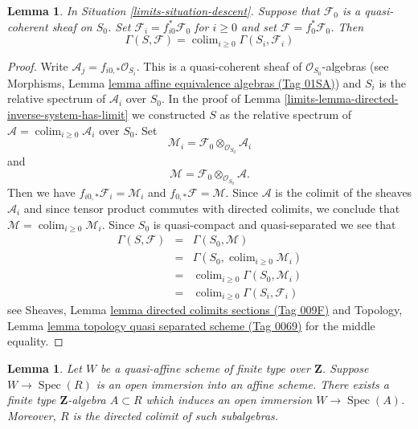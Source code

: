 \documentclass{amsart}
\theoremstyle{plain}
\newtheorem{lemma}[subsection]{Lemma}
\theoremstyle{definition}
\theoremstyle{remark}
\numberwithin{equation}{subsection}
\def\colim{\mathop{\mathrm{colim}}\nolimits}
\def\Spec{\mathop{\mathrm{Spec}}}
\begin{document}
\begin{lemma}
\label{limits-lemma-descend-section}
In Situation \ref{limits-situation-descent}.
Suppose that $\mathcal{F}_0$ is a quasi-coherent sheaf on $S_0$.
Set $\mathcal{F}_i = f_{i0}^*\mathcal{F}_0$ for $i \geq 0$ and set
$\mathcal{F} = f_0^*\mathcal{F}_0$.
Then
$$
\Gamma(S, \mathcal{F}) = \colim_{i \geq 0} \Gamma(S_i, \mathcal{F}_i)
$$
\end{lemma}

\begin{proof}
Write $\mathcal{A}_j = f_{i0, *} \mathcal{O}_{S_i}$.
This is a quasi-coherent sheaf of $\mathcal{O}_{S_0}$-algebras
(see Morphisms, Lemma \href{https://stacks.math.columbia.edu/tag/01SA}{lemma affine equivalence algebras (Tag 01SA)})
and $S_i$ is the relative spectrum of $\mathcal{A}_i$ over $S_0$.
In the proof of Lemma \ref{limits-lemma-directed-inverse-system-has-limit}
we constructed $S$ as the relative spectrum of
$\mathcal{A} = \colim_{i \geq 0} \mathcal{A}_i$
over $S_0$. Set
$$
\mathcal{M}_i = \mathcal{F}_0 \otimes_{\mathcal{O}_{S_0}} \mathcal{A}_i
$$
and
$$
\mathcal{M} = \mathcal{F}_0 \otimes_{\mathcal{O}_{S_0}} \mathcal{A}.
$$
Then we have $f_{i0, *} \mathcal{F}_i = \mathcal{M}_i$
and $f_{0, *}\mathcal{F} = \mathcal{M}$. Since $\mathcal{A}$
is the colimit of the sheaves $\mathcal{A}_i$ and since tensor
product commutes with directed colimits, we conclude that
$\mathcal{M} = \colim_{i \geq 0} \mathcal{M}_i$.
Since $S_0$ is quasi-compact and quasi-separated we see that
\begin{eqnarray*}
\Gamma(S, \mathcal{F})
& = &
\Gamma(S_0, \mathcal{M}) \\
& = &
\Gamma(S_0, \colim_{i \geq 0} \mathcal{M}_i) \\
& = &
\colim_{i \geq 0} \Gamma(S_0, \mathcal{M}_i) \\
& = &
\colim_{i \geq 0} \Gamma(S_i, \mathcal{F}_i)
\end{eqnarray*}
see Sheaves, Lemma \href{https://stacks.math.columbia.edu/tag/009F}{lemma directed colimits sections (Tag 009F)} and
Topology, Lemma \href{https://stacks.math.columbia.edu/tag/0069}{lemma topology quasi separated scheme (Tag 0069)}
for the middle equality.
\end{proof}


\begin{lemma}
\label{limits-lemma-quasi-affine-finite-type-over-Z}
Let $W$ be a quasi-affine scheme of finite type over
$\mathbf{Z}$. Suppose $W \to \Spec(R)$ is an
open immersion into an affine scheme. There exists a
finite type $\mathbf{Z}$-algebra $A \subset R$
which induces an open immersion $W \to \Spec(A)$.
Moreover, $R$ is the directed colimit of such subalgebras.
\end{lemma}
\end{document}
